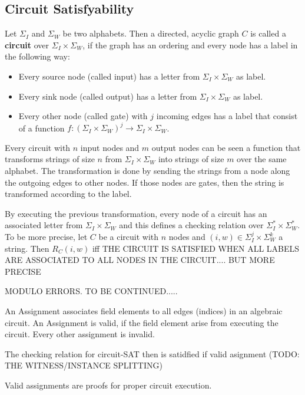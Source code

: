 \subsection{Circuit Satisfyability} 
\begin{definition}[Circuits] Let $\Sigma_I$ and $\Sigma_W$ be two alphabets. Then a directed, acyclic graph $C$ is called a \textbf{circuit} over $\Sigma_I \times \Sigma_W$, if the graph has an ordering and every node has a label in the following way:
\begin{itemize}
\item Every source node (called input) has a letter from $\Sigma_I \times \Sigma_W$ as label.
\item Every sink node (called output) has a letter from $\Sigma_I \times \Sigma_W$ as label.
\item Every other node (called gate) with $j$ incoming edges has a label that consist of a function $f: \left(\Sigma_I \times \Sigma_W\right)^j \to \Sigma_I \times \Sigma_W$.
\end{itemize}
\end{definition}
\begin{remark} Every circuit with $n$ input nodes and $m$ output nodes can be seen a function that transforms strings of size $n$ from $\Sigma_I \times \Sigma_W$ into strings of size $m$ over the same alphabet. The transformation is done by sending the strings from a node along the outgoing edges to other nodes. If those nodes are gates, then the string is transformed according to the label.

By executing the previous transformation, every node of a circuit has an associated letter from $\Sigma_I \times \Sigma_W$ and this defines a checking relation over $\Sigma_I^* \times \Sigma_W^*$. To be more precise, let $C$ be a circuit with $n$ nodes and $(i,w) \in \Sigma_I^j \times \Sigma_W^k$ a string. Then $R_C(i,w)$ iff THE CIRCUIT IS SATISFIED WHEN ALL LABELS ARE ASSOCIATED TO ALL NODES IN THE CIRCUIT.... BUT MORE PRECISE

MODULO ERRORS. TO BE CONTINUED.....

An Assignment associates field elements to all edges (indices) in an algebraic circuit. An Assignment is valid, if the field element arise from executing the circuit. Every other assignment is invalid.

The checking relation for circuit-SAT then is satidfied if valid asignment (TODO: THE WITNESS/INSTANCE SPLITTING)

Valid assignments are proofs for proper circuit execution.
\end{remark}



